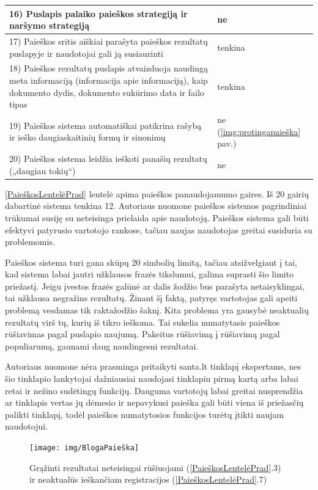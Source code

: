 \documentclass{VUMIFPSkursinis}
\begin{document}
\begin{center}
\begin{tabular}{ |p{}|p{2cm}| }
	16) Puslapis palaiko paieškos strategiją ir naršymo strategiją & ne \\ \hline
	17) Paieškos sritis aiškiai parašyta paieškos rezultatų puslapyje ir naudotojai gali ją susiaurinti & tenkina \\ \hline
	18) Paieškos rezultatų puslapis atvaizduoja naudingą meta informaciją (informacija apie informaciją), kaip dokumento dydis, dokumento sukūrimo data ir failo tipas & tenkina \\ \hline
	19) Paieškos sistema automatiškai patikrina rašybą ir ieško daugiaskaitinių formų ir sinonimų & ne (\ref{img:protingapaieška} pav.) \\ \hline
	20) Paieškos sistema leidžia ieškoti panašių rezultatų („daugiau tokių“) & ne \\ \hline
\end{tabular}
\end{center}

\pagebreak

\ref{PaieškosLentelėPrad} lentelė apima paieškos panaudojamumo gaires. Iš 20 gairių dabartinė sistema tenkina 12. Autoriaus nuomone paieškos sistemos pagrindiniai trūkumai susiję su neteisinga prielaida apie naudotoją. Paieškos sistema gali būti efektyvi patyrusio vartotojo rankose, tačiau naujas naudotojas greitai susiduria su problemomis.

Paieškos sistema turi gana skūpų 20 simbolių limitą, tačiau atsižvelgiant į tai, kad sistema labai jautri užklausos frazės tikslumui, galima suprasti šio limito priežastį. Jeigu įvestos frazės galūnė ar dalis žodžio bus parašyta netaisyklingai, tai užklausa negražins rezultatų. Žinant šį faktą, patyręs vartotojas gali apeiti problemą vesdamas tik raktažodžio šaknį.
Kita problema yra gausybė neaktualių rezultatų virš tų, kurių iš tikro ieškoma. Tai sukelia numatytasis paieškos rūšiavimas pagal puslapio naujumą. Pakeitus rūšiavimą į rūšiavimą pagal  populiarumą, gaunami daug naudingesni rezultatai.

Autoriaus nuomone nėra prasminga pritaikyti santa.lt tinklapį ekspertams, nes šio tinklapio lankytojai dažniausiai naudojasi tinklapiu pirmą kartą arba labai retai ir nežino sudėtingų funkcijų. Dauguma vartotojų labai greitai nusprendžia ar tinklapis vertas jų dėmesio\cite{WebBehaviorsEn} ir nepavykusi paieška gali būti viena iš priežasčių palikti tinklapį, todėl paieškos numatytosios funkcijos turėtų įtikti naujam naudotojui.

\begin{figure}[H]
    \centering
    \texttt{[image: img/BlogaPaieška]}
    \caption{Grąžinti rezultatai neteisingai rūšiuojami (\ref{PaieškosLentelėPrad}.3) ir neaktualūs ieškančiam registracijos (\ref{PaieškosLentelėPrad}.7)}
    \label{img:blogapaieška}
\end{figure}
\end{document}
